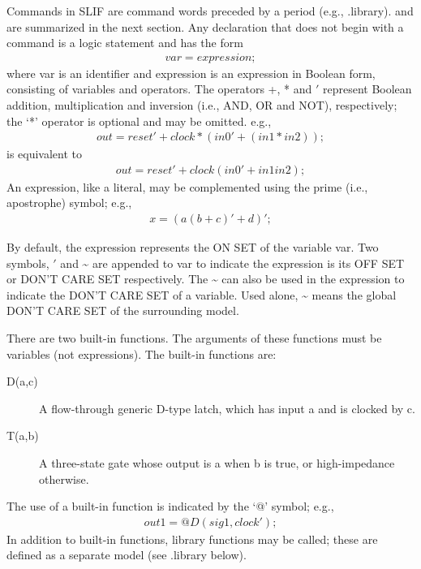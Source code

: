 {\begin{pespace}
     Commands in SLIF are command words preceded by a period
     (e.g., .library). and are summarized in the next section.
     Any declaration that does not begin with a command is a
     logic statement and has the form
\begin{eqnarray*}
                    var = expression ;
\end{eqnarray*}
     where var is an identifier and expression is an expression
     in Boolean form, consisting of variables and operators. The
     operators +, * and $'$ represent Boolean addition, multiplication
     and inversion (i.e., AND, OR and NOT), respectively;
     the `*' operator is optional and may be omitted.  e.g.,
\begin{eqnarray*}
               out = reset' + clock * (in0' + (in1 * in2)) ;
\end{eqnarray*}
     is equivalent to
\begin{eqnarray*}
               out = reset' + clock (in0' + in1 in2) ;
\end{eqnarray*}
     An expression, like a literal, may be complemented using the
     prime (i.e., apostrophe) symbol; e.g.,
\begin{eqnarray*}
                    x = (a (b + c)' + d)' ;
\end{eqnarray*}

     By default, the expression represents the ON SET of the
     variable var. Two symbols, $'$ and \~{} are appended to var to
     indicate the expression is its OFF SET or DON'T CARE SET
     respectively.  The \~{} can also be used in the expression to
     indicate the DON'T CARE SET of a variable.  Used alone, \~{}
     means the global DON'T CARE SET of the surrounding model.

     There are two built-in functions. The arguments of these
     functions must be variables (not expressions).  The built-in
     functions are:

\begin{description}
\item     [D(a,c)] A flow-through generic D-type latch, which has input a
          and is clocked by c.

\item     [T(a,b)] A three-state gate whose output is a when b is true, or
          high-impedance otherwise.
\end{description}

     The use of a built-in function is indicated by the `@' symbol;
	e.g.,
\begin{eqnarray*}
                    out1 = @ D (sig1, clock') ;
\end{eqnarray*}
     In addition to built-in functions, library functions may be
     called; these are defined as a separate model (see .library
     below).


\end{pespace}}
